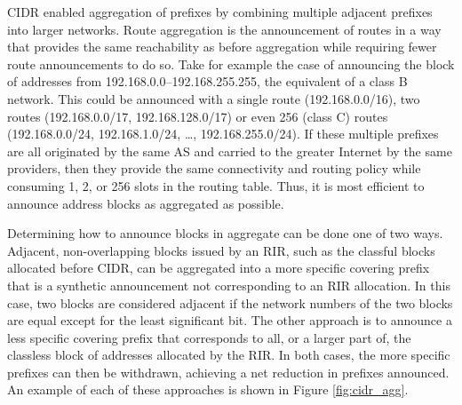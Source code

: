 CIDR enabled aggregation of prefixes by combining multiple adjacent prefixes
into larger networks. Route aggregation is the announcement of routes in a way
that provides the same reachability as before aggregation while requiring fewer
route announcements to do so. Take for example the case of announcing the block
of addresses from 192.168.0.0--192.168.255.255, the equivalent of a class B
network. This could be announced with a single route (192.168.0.0/16), two
routes (192.168.0.0/17, 192.168.128.0/17) or even 256 (class C) routes
(192.168.0.0/24, 192.168.1.0/24, \ldots, 192.168.255.0/24). If these multiple
prefixes are all originated by the same AS and carried to the greater Internet
by the same providers, then they provide the same connectivity and routing
policy while consuming 1, 2, or 256 slots in the routing table.  Thus, it is
most efficient to announce address blocks as aggregated as possible.

Determining how to announce blocks in aggregate can be done one of two ways.
Adjacent, non-overlapping blocks issued by an RIR, such as the classful blocks
allocated before CIDR, can be aggregated into a more specific covering prefix
that is a synthetic announcement not corresponding to an RIR allocation. In
this case, two blocks are considered adjacent if the network numbers of the two
blocks are equal except for the least significant bit. The other approach is to
announce a less specific covering prefix that corresponds to all, or a larger
part of, the classless block of addresses allocated by the RIR. In both cases,
the more specific prefixes can then be withdrawn, achieving a net reduction in
prefixes announced. An example of each of these approaches is shown in Figure
\ref{fig:cidr_agg}.


